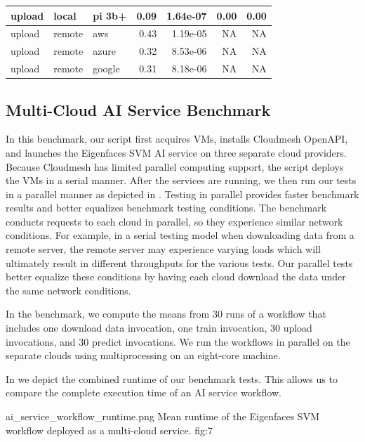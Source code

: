 \begin{table}[htb]
{\begin{tabular}{lllrrrr}
            upload &   local &    pi 3b+ &    0.09 & 1.64e-07 &                0.00 &             0.00 \\
\midrule
            upload &  remote &       aws &    0.43 & 1.19e-05 &                 NA &              NA \\
            upload &  remote &     azure &    0.32 & 8.53e-06 &                 NA &              NA \\
            upload &  remote &    google &    0.31 & 8.18e-06 &                 NA &              NA \\
\bottomrule
\end{tabular}
}
\end{table}

\subsection{Multi-Cloud AI Service Benchmark}
\label{sec-multi-benchmark}

In this benchmark, our script first acquires VMs, installs Cloudmesh
OpenAPI, and launches the Eigenfaces SVM AI service on three separate
cloud providers. Because Cloudmesh has limited parallel computing
support, the script deploys the VMs in a serial manner. After the
services are running, we then run our tests in a parallel manner as
depicted in . Testing in parallel provides faster benchmark
results and better equalizes benchmark testing conditions. The
benchmark conducts requests to each cloud in parallel, so they experience similar network conditions. For example, in a serial testing
model when downloading data from a remote server, the remote server may experience varying loads which will ultimately result in different throughputs for the various tests. Our parallel tests better equalize these conditions by having each cloud download the data under the same network conditions.

In the benchmark, we compute the means from 30 runs of a workflow that includes one download data invocation, one train invocation,
30 upload invocations, and 30 predict invocations. We run the workflows
in parallel on the separate clouds using multiprocessing on an eight-core
machine.

In  we depict the combined runtime of our benchmark tests. This allows us to compare the complete execution time of an AI service workflow.

\OneFIGURE
    {ai_service_workflow_runtime.png}
    {Mean runtime of the Eigenfaces SVM workflow deployed
     as a multi-cloud service.}
    {fig:7}

